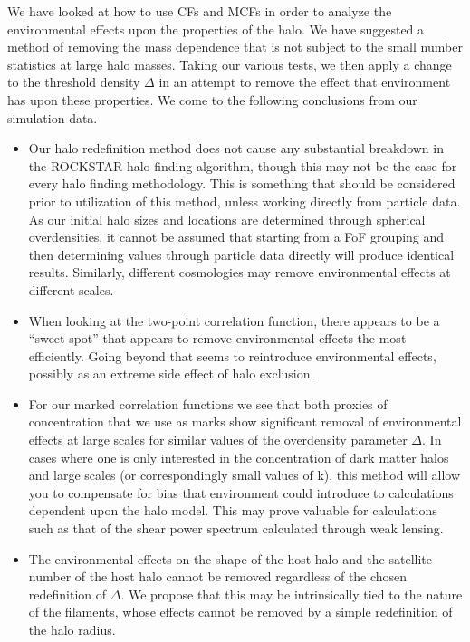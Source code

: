 \documentclass[usenatbib,usegraphicx,letterpaper]{mn2e}
\begin{document}
We have looked at how to use CFs and MCFs in order to analyze the environmental effects upon the properties of the halo. We have suggested a method of removing the mass dependence that is not subject to the small number statistics at large halo masses. Taking our various tests, we then apply a change to the threshold density $\Delta$ in an attempt to remove the effect that environment has upon these properties. We come to the following conclusions from our simulation data.

\begin{itemize}
	\item Our halo redefinition method does not cause any substantial breakdown in the ROCKSTAR halo finding
algorithm, though this may not be the case for every halo finding methodology. This is something that should be
considered prior to utilization of this method, unless working directly from particle data. As our initial halo
sizes and locations are determined through spherical overdensities, it cannot be assumed that starting from a FoF
grouping and then determining values through particle data directly will produce identical results. Similarly,
different cosmologies may remove environmental effects at different scales.

	\item When looking at the two-point correlation function, there appears to be a ``sweet spot'' that appears
to remove environmental effects the most efficiently. Going beyond that seems to reintroduce environmental
effects, possibly as an extreme side effect of halo exclusion.

	\item For our marked correlation functions we see that both proxies of concentration that we use as marks
show significant removal of environmental effects at large scales for similar values of the overdensity parameter
$\Delta$. In cases where one is only interested in the concentration of dark matter halos and large scales (or
correspondingly small values of k), this method will allow you to compensate for bias that environment could
introduce to calculations dependent upon the halo model. This may prove valuable for calculations such as that of
the shear power spectrum calculated through weak lensing.

	\item The environmental effects on the shape of the host halo and the satellite number of the host halo
cannot be removed regardless of the chosen redefinition of $\Delta$. We propose that this may be intrinsically
tied to the nature of the filaments, whose effects cannot be removed by a simple redefinition of the halo radius.


\end{itemize}
\end{document}
